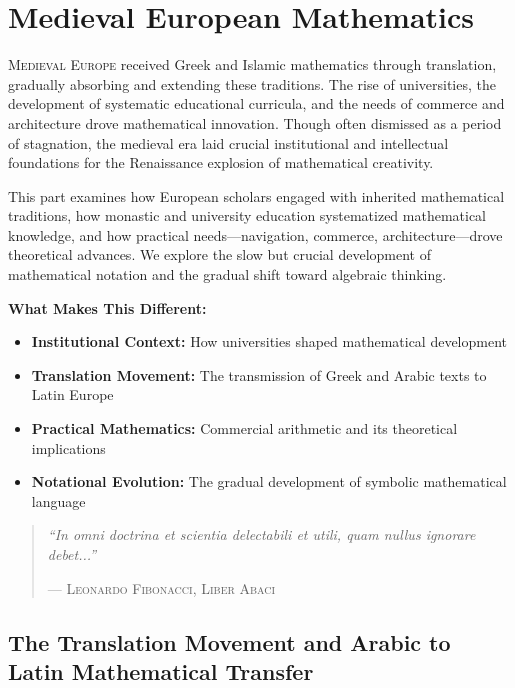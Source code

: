 \part{Medieval European Mathematics}
\label{part:medieval-europe}

\begin{partintro}
\lettrine[lines=3]{M}{edieval Europe} received Greek and Islamic mathematics through translation, gradually absorbing and extending these traditions. The rise of universities, the development of systematic educational curricula, and the needs of commerce and architecture drove mathematical innovation. Though often dismissed as a period of stagnation, the medieval era laid crucial institutional and intellectual foundations for the Renaissance explosion of mathematical creativity.

This part examines how European scholars engaged with inherited mathematical traditions, how monastic and university education systematized mathematical knowledge, and how practical needs—navigation, commerce, architecture—drove theoretical advances. We explore the slow but crucial development of mathematical notation and the gradual shift toward algebraic thinking.

\vspace{1em}
\textbf{What Makes This Different:}
\begin{itemize}[noitemsep]
    \item \textbf{Institutional Context:} How universities shaped mathematical development
    \item \textbf{Translation Movement:} The transmission of Greek and Arabic texts to Latin Europe
    \item \textbf{Practical Mathematics:} Commercial arithmetic and its theoretical implications
    \item \textbf{Notational Evolution:} The gradual development of symbolic mathematical language
\end{itemize}

\begin{quote}
\textit{``In omni doctrina et scientia delectabili et utili, quam nullus ignorare debet...''}

\hfill--- \textsc{Leonardo Fibonacci, Liber Abaci}
\end{quote}
\end{partintro}

\chapter{The Translation Movement and Arabic to Latin Mathematical Transfer  }
